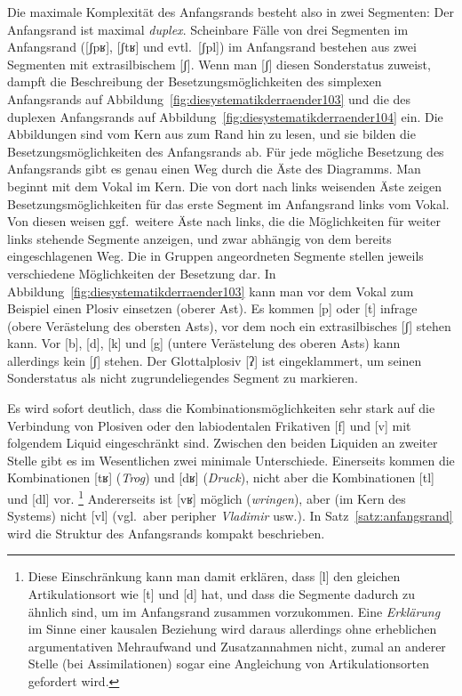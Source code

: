 Die maximale Komplexität des Anfangsrands besteht also in zwei Segmenten:
Der Anfangsrand ist maximal \textit{duplex}.
Scheinbare Fälle von drei Segmenten im Anfangsrand ([ʃpʁ], [ʃtʁ] und evtl.\ [ʃpl]) im Anfangsrand bestehen aus zwei Segmenten mit extrasilbischem [ʃ].
Wenn man [ʃ] diesen Sonderstatus zuweist, dampft die Beschreibung der Besetzungsmöglichkeiten des simplexen Anfangsrands auf Abbildung~\ref{fig:diesystematikderraender103} und die des duplexen Anfangsrands auf Abbildung~\ref{fig:diesystematikderraender104} ein.
Die Abbildungen sind vom Kern aus zum Rand hin zu lesen, und sie bilden die Besetzungsmöglichkeiten des Anfangsrands ab.
Für jede mögliche Besetzung des Anfangsrands gibt es genau einen Weg durch die Äste des Diagramms.
Man beginnt mit dem Vokal im Kern.
Die von dort nach links weisenden Äste zeigen Besetzungsmöglichkeiten für das erste Segment im Anfangsrand links vom Vokal.
Von diesen weisen ggf.\ weitere Äste nach links, die die Möglichkeiten für weiter links stehende Segmente anzeigen, und zwar abhängig von dem bereits eingeschlagenen Weg.
Die in Gruppen angeordneten Segmente stellen jeweils verschiedene Möglichkeiten der Besetzung dar.
In Abbildung~\ref{fig:diesystematikderraender103} kann man vor dem Vokal zum Beispiel einen Plosiv einsetzen (oberer Ast).
Es kommen [p] oder [t] infrage (obere Verästelung des obersten Asts), vor dem noch ein extrasilbisches [ʃ] stehen kann.
Vor [b], [d], [k] und [g] (untere Verästelung des oberen Asts) kann allerdings kein [ʃ] stehen.
Der Glottalplosiv [ʔ] ist eingeklammert, um seinen Sonderstatus als nicht zugrundeliegendes Segment zu markieren.

Es wird sofort deutlich, dass die Kombinationsmöglichkeiten sehr stark auf die Verbindung von Plosiven oder den labiodentalen Frikativen [f] und [v] mit folgendem Liquid eingeschränkt sind.
Zwischen den beiden Liquiden an zweiter Stelle gibt es im Wesentlichen zwei minimale Unterschiede.
Einerseits kommen die Kombinationen [tʁ] (\textit{Trog}) und [dʁ] (\textit{Druck}), nicht aber die Kombinationen [tl] und [dl] vor.%
\footnote{Diese Einschränkung kann man damit erklären, dass [l] den gleichen Artikulationsort wie [t] und [d] hat, und dass die Segmente dadurch zu ähnlich sind, um im Anfangsrand zusammen vorzukommen.
Eine \textit{Erklärung} im Sinne einer kausalen Beziehung wird daraus allerdings ohne erheblichen argumentativen Mehraufwand und Zusatzannahmen nicht, zumal an anderer Stelle (bei Assimilationen) sogar eine Angleichung von Artikulationsorten gefordert wird.}
Andererseits ist [vʁ] möglich (\textit{wringen}), aber (im Kern des Systems) nicht [vl] (vgl.\ aber peripher \textit{Vladimir} usw.).
In Satz~\ref{satz:anfangsrand} wird die Struktur des Anfangsrands kompakt beschrieben.

